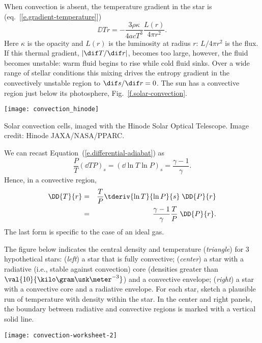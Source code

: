 When convection is absent, the temperature gradient in the star is (eq.~[\ref{e.gradient-temperature}])
\[
    \DD{T}{r} = -\frac{3\rho\kappa}{4acT^3}\frac{L(r)}{4\pi r^2}.
\]
Here $\kappa$ is the opacity and $L(r)$ is the luminosity at radius $r$: $L/4\pi r^2$ is the flux. If this thermal gradient, $|\dif T/\dif r|$, becomes too large, however, the fluid becomes unstable: warm fluid begins to rise while cold fluid sinks. Over a wide range of stellar conditions this mixing drives the entropy gradient in the convectively unstable region to $\dif s/\dif r = 0$. The sun has a convective region just below its photosphere, Fig.~\ref{f.solar-convection}.
\begin{marginfigure}
\texttt{[image: convection\_hinode]}
\caption[Solar convection cells]{\label{f.solar-convection} Solar convection cells, imaged with the Hinode Solar Optical Telescope. Image credit: Hinode JAXA/NASA/PPARC.}
\end{marginfigure}

We can recast Equation~(\ref{e.differential-adiabat}) as
\begin{equation}
    \frac{P}{T}\left(\dd{T}{P}\right)_s = \left(\dd{\ln T}{\ln P}\right)_s = \frac{\gamma-1}{\gamma}.
\label{e.nabla-adiabat}
\end{equation}
Hence, in a convective region,
\begin{eqnarray}
\DD{T}{r} &=& \frac{T}{P}\tderiv{\ln T}{\ln P}{s}\;\DD{P}{r} \nonumber\\
 &=& \frac{\gamma-1}{\gamma} \frac{T}{P}\; \DD{P}{r}.
\end{eqnarray}
The last form is specific to the case of an ideal gas.

\begin{exercisebox}
The figure below indicates the central density and temperature (\emph{triangle}) for 3 hypothetical stars: (\emph{left}) a star that is fully convective; (\emph{center}) a star with a radiative (i.e., stable against convection) core (densities greater than $\val{10}{\kilo\gram\usk\meter^{-3}}$) and a convective envelope; (\emph{right}) a star with a convective core and a radiative envelope. For each star, sketch a plausible run of temperature with density within the star. In the center and right panels, the boundary between radiative and convective regions is marked with a vertical solid line.

\texttt{[image: convection-worksheet-2]}
\end{exercisebox}

